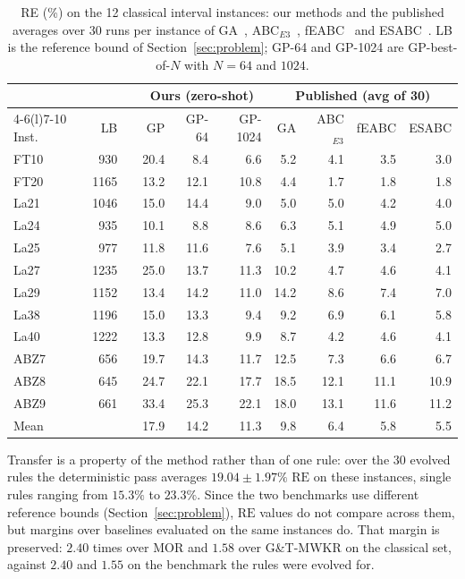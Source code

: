 \documentclass[preprint,number,sort&compress,12pt]{elsarticle}
\newcommand{\RE}{\mathrm{RE}}
\begin{document}
\begin{table}[t]
\centering\small
\caption{RE (\%) on the 12 classical interval instances: our methods and the
published averages over 30 runs per instance of GA~\citep{DiazGA2020},
ABC$_{E3}$~\citep{DiazABC2022}, fEABC~\citep{DiazFEABC2023} and
ESABC~\citep{DiazICAE2023}. LB is the reference bound of
Section~\ref{sec:problem}; GP-64 and GP-1024 are GP-best-of-$N$ with
$N = 64$ and $1024$.}
\label{tab:classics}
\setlength{\tabcolsep}{4.5pt}
\begin{tabular}{lrrrrrrrrr}
\toprule
& & & \multicolumn{3}{c}{Ours (zero-shot)} &
\multicolumn{4}{c}{Published (avg of 30)} \\
\cmidrule(lr){4-6}\cmidrule(l){7-10}
Inst. & LB & & GP & GP-64 & GP-1024 &
GA & ABC$_{E3}$ & fEABC & ESABC \\
\midrule
FT10 & 930 & & 20.4 & 8.4 & 6.6 & 5.2 & 4.1 & 3.5 & 3.0 \\
FT20 & 1165 & & 13.2 & 12.1 & 10.8 & 4.4 & 1.7 & 1.8 & 1.8 \\
La21 & 1046 & & 15.0 & 14.4 & 9.0 & 5.0 & 5.0 & 4.2 & 4.0 \\
La24 & 935 & & 10.1 & 8.8 & 8.6 & 6.3 & 5.1 & 4.9 & 5.0 \\
La25 & 977 & & 11.8 & 11.6 & 7.6 & 5.1 & 3.9 & 3.4 & 2.7 \\
La27 & 1235 & & 25.0 & 13.7 & 11.3 & 10.2 & 4.7 & 4.6 & 4.1 \\
La29 & 1152 & & 13.4 & 14.2 & 11.0 & 14.2 & 8.6 & 7.4 & 7.0 \\
La38 & 1196 & & 15.0 & 13.3 & 9.4 & 9.2 & 6.9 & 6.1 & 5.8 \\
La40 & 1222 & & 13.3 & 12.8 & 9.9 & 8.7 & 4.2 & 4.6 & 4.1 \\
ABZ7 & 656 & & 19.7 & 14.3 & 11.7 & 12.5 & 7.3 & 6.6 & 6.7 \\
ABZ8 & 645 & & 24.7 & 22.1 & 17.7 & 18.5 & 12.1 & 11.1 & 10.9 \\
ABZ9 & 661 & & 33.4 & 25.3 & 22.1 & 18.0 & 13.1 & 11.6 & 11.2 \\
\midrule
Mean & & & 17.9 & 14.2 & 11.3 & 9.8 & 6.4 & 5.8 & 5.5 \\
\bottomrule
\end{tabular}
\end{table}

Transfer is a property of the method rather than of one rule: over the
30 evolved rules the deterministic pass averages $19.04 \pm 1.97\%$
$\RE$ on these instances, single rules ranging from $15.3\%$ to
$23.3\%$. Since the two benchmarks use different reference bounds
(Section~\ref{sec:problem}), $\RE$ values do not compare across them,
but margins over baselines evaluated on the same instances do. That
margin is preserved: $2.40$ times over MOR and $1.58$ over G\&T-MWKR on
the classical set, against $2.40$ and $1.55$ on the benchmark the rules
were evolved for.
\end{document}
